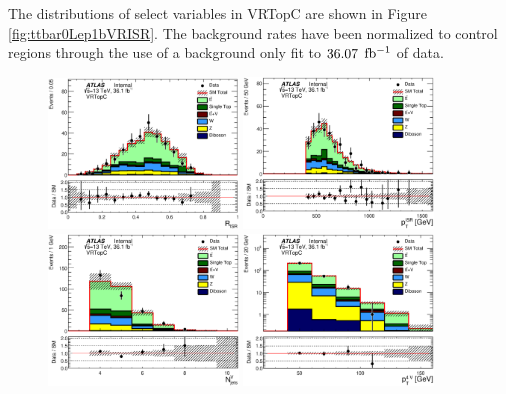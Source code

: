\indent The distributions of select variables in VRTopC are shown in Figure \ref{fig:ttbar0Lep1bVRISR}.  The background rates have been normalized to control regions through the use of a background only fit to $36.07$ $\mbox{fb$^{-1}$}$ of data. \\

\begin{figure}[htbp]
  \centering
    \includegraphics[width=0.45\textwidth]{figures/ttbar/postfit/CA_RISR_VRTopC}
    \includegraphics[width=0.45\textwidth]{figures/ttbar/postfit/CA_pTISR_VRTopC}
    \includegraphics[width=0.45\textwidth]{figures/ttbar/postfit/CA_NjV_VRTopC}
    \includegraphics[width=0.45\textwidth]{figures/ttbar/postfit/CA_pTjV4_VRTopC_log}

\end{figure}
